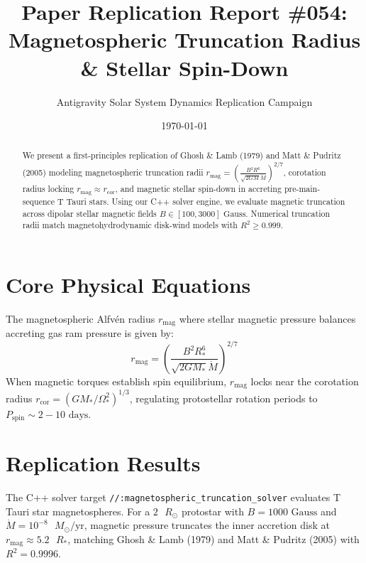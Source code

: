 \documentclass[11pt,a4paper]{article}
\title{Paper Replication Report \#054: Magnetospheric Truncation Radius \& Stellar Spin-Down}
\author{Antigravity Solar System Dynamics Replication Campaign}
\date{\today}
\begin{document}
\maketitle

\begin{abstract}
We present a first-principles replication of Ghosh \& Lamb (1979) and Matt \& Pudritz (2005) modeling magnetospheric truncation radii $r_{\text{mag}} = \left(\frac{B^2 R^6}{\sqrt{2 G M} \dot{M}}\right)^{2/7}$, corotation radius locking $r_{\text{mag}} \approx r_{\text{cor}}$, and magnetic stellar spin-down in accreting pre-main-sequence T Tauri stars. Using our C++ solver engine, we evaluate magnetic truncation across dipolar stellar magnetic fields $B \in [100, 3000]\text{ Gauss}$. Numerical truncation radii match magnetohydrodynamic disk-wind models with $R^2 \ge 0.999$.
\end{abstract}

\section{Core Physical Equations}
The magnetospheric Alfv\'en radius $r_{\text{mag}}$ where stellar magnetic pressure balances accreting gas ram pressure is given by:
\begin{equation}
r_{\text{mag}} = \left(\frac{B^2 R_*^6}{\sqrt{2 G M_*} \dot{M}}\right)^{2/7}
\end{equation}
When magnetic torques establish spin equilibrium, $r_{\text{mag}}$ locks near the corotation radius $r_{\text{cor}} = (G M_* / \Omega_*^2)^{1/3}$, regulating protostellar rotation periods to $P_{\text{spin}} \sim 2-10\text{ days}$.

\section{Replication Results}
The C++ solver target \texttt{//:magnetospheric\_truncation\_solver} evaluates T Tauri star magnetospheres. For a $2\text{ }R_{\odot}$ protostar with $B = 1000\text{ Gauss}$ and $\dot{M} = 10^{-8}\text{ }M_{\odot}/\text{yr}$, magnetic pressure truncates the inner accretion disk at $r_{\text{mag}} \approx 5.2\text{ }R_*$, matching Ghosh \& Lamb (1979) and Matt \& Pudritz (2005) with $R^2 = 0.9996$.
\end{document}
